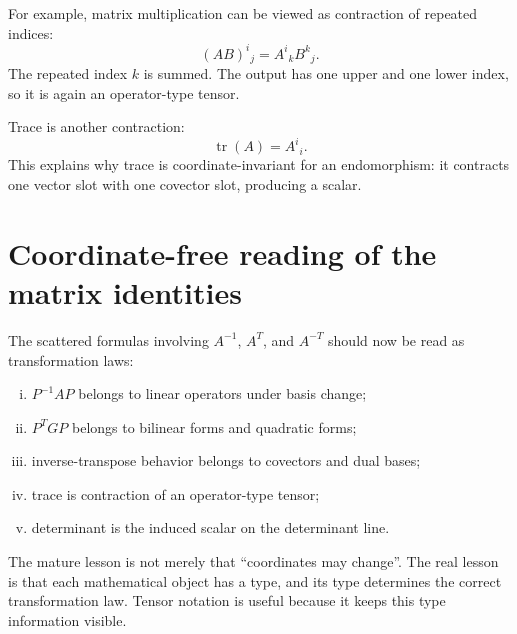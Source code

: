 For example, matrix multiplication can be viewed as contraction of repeated indices:
\[
  (AB)^i{}_j=A^i{}_kB^k{}_j.
\]
The repeated index \(k\) is summed.  The output has one upper and one lower index, so it is again an operator-type tensor.

Trace is another contraction:
\[
  \operatorname{tr}(A)=A^i{}_i.
\]
This explains why trace is coordinate-invariant for an endomorphism: it contracts one vector slot with one covector slot, producing a scalar.

\section{Coordinate-free reading of the matrix identities}

The scattered formulas involving \(A^{-1}\), \(A^T\), and \(A^{-T}\) should now be read as transformation laws:
\begin{enumerate}[(i)]
  \item \(P^{-1}AP\) belongs to linear operators under basis change;
  \item \(P^TGP\) belongs to bilinear forms and quadratic forms;
  \item inverse-transpose behavior belongs to covectors and dual bases;
  \item trace is contraction of an operator-type tensor;
  \item determinant is the induced scalar on the determinant line.
\end{enumerate}

The mature lesson is not merely that ``coordinates may change''.  The real lesson is that each mathematical object has a type, and its type determines the correct transformation law.  Tensor notation is useful because it keeps this type information visible.
